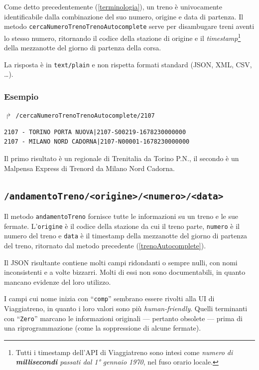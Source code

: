 \documentclass[12pt,a4paper,italian]{report}
\begin{document}
Come detto precedentemente (\ref{terminologia}), un treno è
univocamente identificabile dalla combinazione del suo numero, origine
e data di partenza.  Il metodo
\texttt{cerca\-Numero\-Treno\-Treno\-Autocomplete} serve per
disambugare treni aventi lo stesso numero, ritornando il codice della
stazione di origine e il
\textit{timestamp}\footnote{\label{timestamp}Tutti i timestamp
    dell'API di Viaggiatreno sono intesi come \textit{numero di
        \textbf{millisecondi} passati dal 1° gennaio 1970}, nel fuso
    orario locale.} della mezzanotte del giorno di partenza della
corsa.

La risposta è in \texttt{text/plain} e non rispetta formati standard
(JSON, XML, CSV, \dots).

\subsubsection{Esempio}

$\Rsh$ \texttt{/cercaNumeroTrenoTrenoAutocomplete/2107}

\begin{verbatim}
2107 - TORINO PORTA NUOVA|2107-S00219-1678230000000
2107 - MILANO NORD CADORNA|2107-N00001-1678230000000
\end{verbatim}

Il primo risultato è un regionale di Trenitalia da Torino P.N., il
secondo è un Malpensa Express di Trenord da Milano Nord Cadorna.

\subsection{\texttt{/andamentoTreno/<origine>/<numero>/<data>}}
\label{andamentoTreno}

Il metodo \texttt{andamentoTreno} fornisce tutte le informazioni su un
treno e le sue fermate.  L'\texttt{origine} è il codice della stazione
da cui il treno parte, \texttt{numero} è il numero del treno e
\texttt{data} è il timestamp della mezzanotte del giorno di partenza
del treno, ritornato dal metodo precedente (\ref{trenoAutocomplete}).

Il JSON risultante contiene molti campi ridondanti o sempre nulli, con
nomi inconsistenti e a volte bizzarri.  Molti di essi non sono
documentabili, in quanto mancano evidenze del loro utilizzo.

I campi cui nome inizia con ``\texttt{comp}'' sembrano essere rivolti
alla UI di Viaggiatreno, in quanto i loro valori sono più
\textit{human-friendly}. Quelli terminanti con ``\texttt{Zero}''
marcano le informazioni originali --- pertanto obsolete --- prima di
una riprogrammazione (come la soppressione di alcune fermate).
\end{document}
